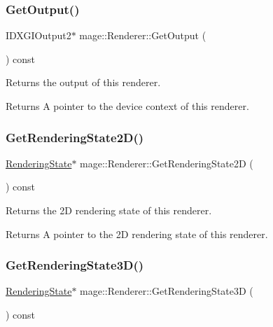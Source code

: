 \subsubsection{\texorpdfstring{Get\+Output()}{GetOutput()}}
{\footnotesize\ttfamily I\+D\+X\+G\+I\+Output2$\ast$ mage\+::\+Renderer\+::\+Get\+Output (\begin{DoxyParamCaption}{ }\end{DoxyParamCaption}) const\hspace{0.3cm}{\ttfamily [noexcept]}}

Returns the output of this renderer.

\begin{DoxyReturn}{Returns}
A pointer to the device context of this renderer. 
\end{DoxyReturn}
\hypertarget{classmage_1_1_renderer_a4259de775cde2ce71b426f8e88a3afe2}{}\label{classmage_1_1_renderer_a4259de775cde2ce71b426f8e88a3afe2} 
\subsubsection{\texorpdfstring{Get\+Rendering\+State2\+D()}{GetRenderingState2D()}}
{\footnotesize\ttfamily \hyperlink{structmage_1_1_rendering_state}{Rendering\+State}$\ast$ mage\+::\+Renderer\+::\+Get\+Rendering\+State2D (\begin{DoxyParamCaption}{ }\end{DoxyParamCaption}) const\hspace{0.3cm}{\ttfamily [noexcept]}}

Returns the 2D rendering state of this renderer.

\begin{DoxyReturn}{Returns}
A pointer to the 2D rendering state of this renderer. 
\end{DoxyReturn}
\hypertarget{classmage_1_1_renderer_afde0b947dfcfea3515f6ddbfc25b8253}{}\label{classmage_1_1_renderer_afde0b947dfcfea3515f6ddbfc25b8253} 
\subsubsection{\texorpdfstring{Get\+Rendering\+State3\+D()}{GetRenderingState3D()}}
{\footnotesize\ttfamily \hyperlink{structmage_1_1_rendering_state}{Rendering\+State}$\ast$ mage\+::\+Renderer\+::\+Get\+Rendering\+State3D (\begin{DoxyParamCaption}{ }\end{DoxyParamCaption}) const\hspace{0.3cm}{\ttfamily [noexcept]}}

